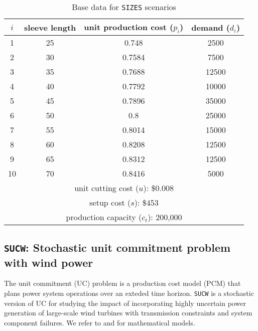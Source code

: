 \begin{table}[]
	\centering
	\caption{Base data for \texttt{SIZES} scenarios \cite{journal:JSW1999}}
	\label{sizes:data}
	\begin{tabular}{cccc}
		\hline
		$i$  & sleeve length & unit production cost ($p_i$) & demand ($d_i$) \\ \hline
		1  & 25            & 0.748                & 2500   \\
		2  & 30            & 0.7584               & 7500   \\
		3  & 35            & 0.7688               & 12500  \\
		4  & 40            & 0.7792               & 10000  \\
		5  & 45            & 0.7896               & 35000  \\
		6  & 50            & 0.8                  & 25000  \\
		7  & 55            & 0.8014               & 15000  \\
		8  & 60            & 0.8208               & 12500  \\
		9  & 65            & 0.8312               & 12500  \\
		10 & 70            & 0.8416               & 5000   \\ \hline
		\multicolumn{4}{c}{unit cutting cost ($u$): \$0.008}     \\
		\multicolumn{4}{c}{setup cost ($s$): \$453}              \\ 
		\multicolumn{4}{c}{production capacity ($c_t$): 200,000} \\ \hline
	\end{tabular}
\end{table}


\subsection{\texttt{SUCW}: Stochastic unit commitment problem with wind power}
The unit commitment (UC) problem is a production cost model (PCM) that plans power system operations over an exteded time horizon. \texttt{SUCW} is a stochastic version of UC for studying the impact of incorporating highly uncertain power generation of large-scale wind turbines with transmission constraints and system component failures. We refer to \cite{journal:PO2013} and \cite{journal:KZ2015} for mathematical models.
